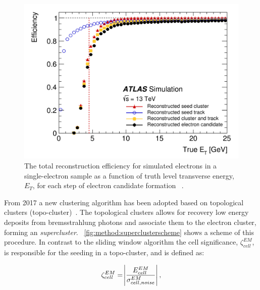 \begin{figure}[]
    \centering
    \includegraphics[width=\mediumfigwidth]{images/2015_2016_recoeff.png}
    \caption[Total reconstruction energy for simulated electrons using the sliding window algorithm]{The total reconstruction efficiency for simulated electrons in a single-electron sample as a function of truth level transverse energy, $E_T$, for each step of electron candidate formation ~\cite{slidingwindowreco}.}
    \label{fig:method:slidingwindow-reco}
\end{figure}

From 2017 a new clustering algorithm has been adopted based on topological clusters (topo-cluster)~\cite{Aad:2019tso}. The topological clusters allows for recovery low energy deposits from bremsstrahlung photons and associate them to the electron cluster, forming an \emph{supercluster}. ~\cref{fig:method:superclusterscheme} shows a scheme of this procedure. In contrast to the sliding window algorithm the cell significance, $\zeta^{EM}_{cell}$, is responsible for the seeding in a topo-cluster, and is defined as:

\begin{equation}
    \zeta^{EM}_{cell} = \abs{\frac{E^{EM}_{cell}}{\sigma^{EM}_{cell,noise}}},
\end{equation}

